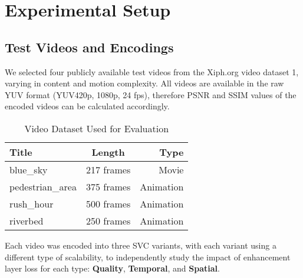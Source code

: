 \section{Experimental Setup}

    \subsection{Test Videos and Encodings}
        We selected four publicly available test videos from the Xiph.org video
        dataset 1, varying in content and motion complexity. All videos are
        available in the raw YUV format (YUV420p, 1080p, 24 fps), therefore PSNR
        and SSIM values of the encoded videos can be calculated accordingly. 

        \begin{table}[H]
            \centering
            \begin{tabular}{lcr}
                \toprule
                Title               & Length        & Type      \\
                \midrule
                blue\_sky           & 217 frames    & Movie \\
                pedestrian\_area    & 375 frames    & Animation \\
                rush\_hour          & 500 frames    & Animation \\
                riverbed            & 250 frames    & Animation \\
                \bottomrule
            \end{tabular}
            \caption{Video Dataset Used for Evaluation}
            \label{tab:video_dataset}
        \end{table}

        Each video was encoded into three SVC variants, with each variant using a
        different type of scalability, to independently study the impact of
        enhancement layer loss for each type: \textbf{Quality}, \textbf{Temporal},
        and \textbf{Spatial}.

